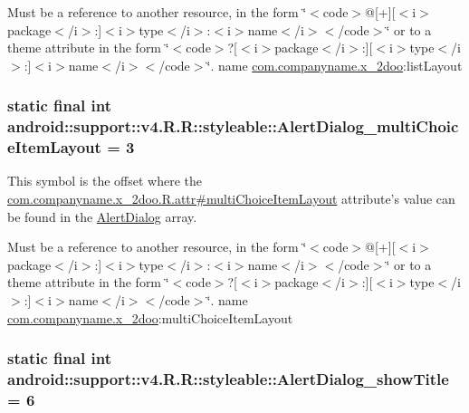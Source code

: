 Must be a reference to another resource, in the form \char`\"{}$<$code$>$@\mbox{[}+\mbox{]}\mbox{[}$<$i$>$package$<$/i$>$:\mbox{]}$<$i$>$type$<$/i$>$:$<$i$>$name$<$/i$>$$<$/code$>$\char`\"{} or to a theme attribute in the form \char`\"{}$<$code$>$?\mbox{[}$<$i$>$package$<$/i$>$:\mbox{]}\mbox{[}$<$i$>$type$<$/i$>$:\mbox{]}$<$i$>$name$<$/i$>$$<$/code$>$\char`\"{}.  name \hyperlink{namespacecom_1_1companyname_1_1x__2doo}{com.companyname.x\_\-2doo}:listLayout \hypertarget{classandroid_1_1support_1_1v4_1_1_r_1_1styleable_c064dc58d9cc15c073b7697e72f46058}{
\subsubsection[{AlertDialog\_\-multiChoiceItemLayout}]{\setlength{\rightskip}{0pt plus 5cm}static final int android::support::v4.R.R::styleable::AlertDialog\_\-multiChoiceItemLayout = 3}}
\label{classandroid_1_1support_1_1v4_1_1_r_1_1styleable_c064dc58d9cc15c073b7697e72f46058}


This symbol is the offset where the \hyperlink{classcom_1_1companyname_1_1x__2doo_1_1_r_1_1attr_01c5f4b17d9504d30489cc2cc0add672}{com.companyname.x\_\-2doo.R.attr\#multiChoiceItemLayout} attribute's value can be found in the \hyperlink{classandroid_1_1support_1_1v4_1_1_r_1_1styleable_984adead369fc9c6b58c85f88690832f}{AlertDialog} array.

Must be a reference to another resource, in the form \char`\"{}$<$code$>$@\mbox{[}+\mbox{]}\mbox{[}$<$i$>$package$<$/i$>$:\mbox{]}$<$i$>$type$<$/i$>$:$<$i$>$name$<$/i$>$$<$/code$>$\char`\"{} or to a theme attribute in the form \char`\"{}$<$code$>$?\mbox{[}$<$i$>$package$<$/i$>$:\mbox{]}\mbox{[}$<$i$>$type$<$/i$>$:\mbox{]}$<$i$>$name$<$/i$>$$<$/code$>$\char`\"{}.  name \hyperlink{namespacecom_1_1companyname_1_1x__2doo}{com.companyname.x\_\-2doo}:multiChoiceItemLayout \hypertarget{classandroid_1_1support_1_1v4_1_1_r_1_1styleable_a4d768767c275e92e5916084f753a001}{
\subsubsection[{AlertDialog\_\-showTitle}]{\setlength{\rightskip}{0pt plus 5cm}static final int android::support::v4.R.R::styleable::AlertDialog\_\-showTitle = 6}}
\label{classandroid_1_1support_1_1v4_1_1_r_1_1styleable_a4d768767c275e92e5916084f753a001}


